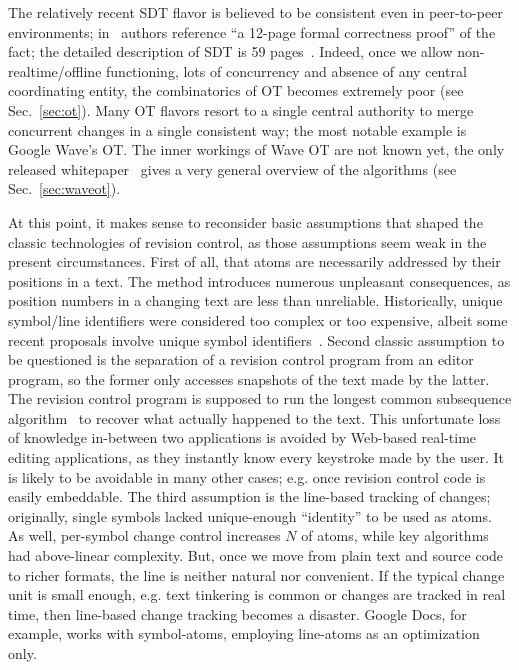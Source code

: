 \documentclass{acm_proc_article-sp}
\begin{document}
The relatively recent SDT flavor is believed to be consistent even in peer-to-peer environments; in~\cite{lili-preserving} authors reference ``a 12-page formal correctness proof'' of the fact; the detailed description of SDT is 59 pages~\cite{lili-ensuring}.
Indeed, once we allow non-realtime/offline functioning, lots of concurrency and absence of any central coordinating entity, the combinatorics of OT becomes extremely poor (see Sec.~\ref{sec:ot}).
Many OT flavors resort to a single central authority to merge concurrent changes in a single consistent way; the most notable example is Google Wave's OT.
The inner workings of Wave OT are not known yet, the only released whitepaper~\cite{waveot} gives a very general overview of the algorithms (see Sec.~\ref{sec:waveot}).

At this point, it makes sense to reconsider basic assumptions that shaped the classic technologies of revision control, as those assumptions seem weak in the present circumstances. 
First of all, that atoms are necessarily addressed by their positions in a text.
The method introduces numerous unpleasant consequences, as position numbers in a changing text are less than unreliable. 
Historically, unique symbol/line identifiers were considered too complex or too expensive, albeit some recent proposals involve unique symbol identifiers~\cite{woot}.
Second classic assumption to be questioned is the separation of a revision control program from an editor program, so the former only accesses snapshots of the text made by the latter.
The revision control program is supposed to run the longest common subsequence algorithm~\cite{lcs-algo} to recover what actually happened to the text.
This unfortunate loss of knowledge in-between two applications is avoided by Web-based real-time editing applications, as they instantly know every keystroke made by the user.
It is likely to be avoidable in many other cases; e.g. once revision control code is easily embeddable.
The third assumption is the line-based tracking of changes; originally, single symbols lacked unique-enough ``identity'' to be used as atoms.
As well, per-symbol change control increases $N$ of atoms, while key algorithms had above-linear complexity.
But, once we move from plain text and source code to richer formats, the line is neither natural nor convenient.
If the typical change unit is small enough, e.g. text tinkering is common or changes are tracked in real time, then line-based change tracking becomes a disaster.
Google Docs, for example, works with symbol-atoms, employing line-atoms as an optimization only.
\end{document}
